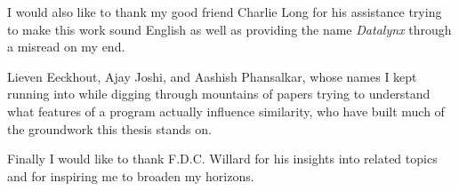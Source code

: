 I would also like to thank my good friend Charlie Long for his assistance trying to make this work sound English as well as providing the name \emph{Datalynx} through a misread on my end.

Lieven Eeckhout, Ajay Joshi, and Aashish Phansalkar, whose names I kept running into while digging through mountains of papers trying to understand what features of a program actually influence similarity, who have built much of the groundwork this thesis stands on.

Finally I would like to thank F.D.C. Willard for his insights into related topics and for inspiring me to broaden my horizons.